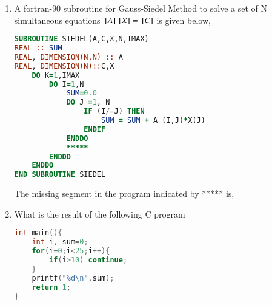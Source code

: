 \documentclass[journal]{IEEEtran}
\begin{document}
\begin{enumerate}
\begin{lstlisting}[language=Fortran]
(Q) SUBROUTINE SWAP(A,B)
    INTEGER, INTENT(IN)::A,B
    TEMP A
    A=B
    B=TEMP
    END SUBROUTINE SWAP
(R) IF (A/=B) X =Y-Z
    ELSE
        X=Y+Z
    ENDIF
(S) DO I=1,N,3
        C(I)=A(I)+B(I)
    END DO
\end{lstlisting}
Which segments have syntax error
	\begin{enumerate}
\end{enumerate}
\item A fortran-$90$ subroutine for Gauss-Siedel Method to solve a set of N simultaneous equations $ {}\left[A\right] {}\left[X\right]= {}\left[C\right]$ is given below,
\begin{lstlisting}[language=Fortran]
SUBROUTINE SIEDEL(A,C,X,N,IMAX)
REAL :: SUM
REAL, DIMENSION(N,N) :: A
REAL, DIMENSION(N)::C,X
    DO K=1,IMAX 
        DO I=1,N
            SUM=0.0
            DO J =1, N
                IF (I/=J) THEN
                    SUM = SUM + A (I,J)*X(J)
                ENDIF
            ENDDO
            *****
        ENDDO
    ENDDO
END SUBROUTINE SIEDEL
\end{lstlisting}
The missing segment in the program indicated by ***** is,
\begin{enumerate}
\end{enumerate}
\item What is the result of the following C program
\begin{lstlisting}[language=C]
int main(){
    int i, sum=0;
    for(i=0;i<25;i++){
        if(i>10) continue;
    }
    printf("%d\n",sum);
    return 1;
}
\end{lstlisting}


\end{enumerate}
\end{document}
